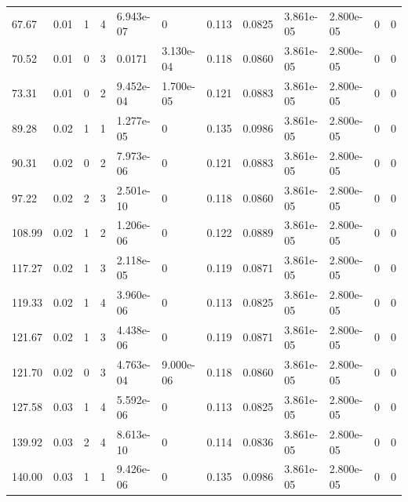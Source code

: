 \documentclass[preview]{standalone}
\begin{document}
{{\begin{tabular}{L{1.2cm}C{1.2cm} C{0.3cm}C{0.5cm} C{1.4cm}C{1.4cm} C{1.4cm}C{1.4cm} C{1.6cm}C{1.6cm} C{1.6cm}C{1.6cm}}
  67.67  &  0.01  & 1     &  4 &  6.943e-07  & 0  &  0.113&   0.0825& 3.861e-05 & 2.800e-05   &  0 & 0  \\ 
  70.52  &  0.01  & 0     &  3 &  0.0171  & 3.130e-04  &  0.118&   0.0860& 3.861e-05 & 2.800e-05   &  0 & 0  \\ 
  73.31  &  0.01  & 0     &  2 &  9.452e-04  & 1.700e-05  &  0.121&   0.0883& 3.861e-05 & 2.800e-05   &  0 & 0  \\ 
  89.28  &  0.02  & 1     &  1 &  1.277e-05  & 0  &  0.135&   0.0986& 3.861e-05 & 2.800e-05   &  0 & 0  \\ 
  90.31  &  0.02  & 0     &  2 &  7.973e-06  & 0  &  0.121&   0.0883& 3.861e-05 & 2.800e-05   &  0 & 0  \\ 
  97.22  &  0.02  & 2     &  3 &  2.501e-10  & 0  &  0.118&   0.0860& 3.861e-05 & 2.800e-05   &  0 & 0  \\ 
  108.99  &  0.02  & 1     &  2 &  1.206e-06  & 0  &  0.122&   0.0889& 3.861e-05 & 2.800e-05   &  0 & 0  \\ 
  117.27  &  0.02  & 1     &  3 &  2.118e-05  & 0  &  0.119&   0.0871& 3.861e-05 & 2.800e-05   &  0 & 0  \\ 
  119.33  &  0.02  & 1     &  4 &  3.960e-06  & 0  &  0.113&   0.0825& 3.861e-05 & 2.800e-05   &  0 & 0  \\ 
  121.67  &  0.02  & 1     &  3 &  4.438e-06  & 0  &  0.119&   0.0871& 3.861e-05 & 2.800e-05   &  0 & 0  \\ 
  121.70  &  0.02  & 0     &  3 &  4.763e-04  & 9.000e-06  &  0.118&   0.0860& 3.861e-05 & 2.800e-05   &  0 & 0  \\ 
  127.58  &  0.03  & 1     &  4 &  5.592e-06  & 0  &  0.113&   0.0825& 3.861e-05 & 2.800e-05   &  0 & 0  \\ 
  139.92  &  0.03  & 2     &  4 &  8.613e-10  & 0  &  0.114&   0.0836& 3.861e-05 & 2.800e-05   &  0 & 0  \\ 
  140.00  &  0.03  & 1     &  1 &  9.426e-06  & 0  &  0.135&   0.0986& 3.861e-05 & 2.800e-05   &  0 & 0  \\ 
\hline 
\end{tabular} 

}}
\end{document}
